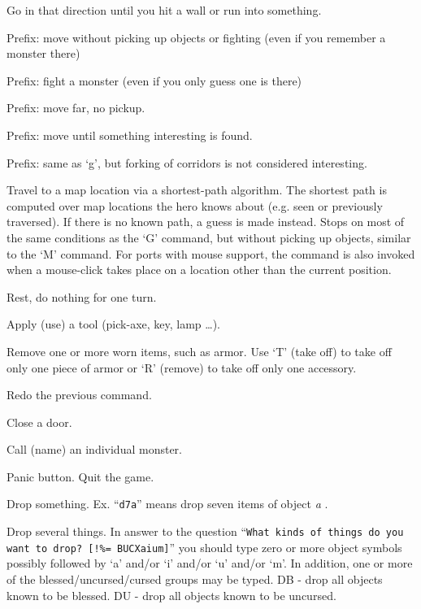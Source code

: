 \item[\tb{[YUHJKLBN]}]
Go in that direction until you hit a wall or run into something.
\item[\tb{m[yuhjklbn]}]
Prefix:  move without picking up objects or fighting (even if you remember
a monster there)
\item[\tb{F[yuhjklbn]}]
Prefix:  fight a monster (even if you only guess one is there)
\item[\tb{M[yuhjklbn]}]
Prefix:  move far, no pickup.
\item[\tb{"g[yuhjklbn]}]
Prefix:  move until something interesting is found.
\item[\tb{"G[yuhjklbn] or <CONTROL->[yuhjklbn]}]
Prefix:  same as `g', but forking of corridors is not considered interesting.
\item[\tb{\_}]
Travel to a map location via a shortest-path algorithm.  The shortest path
is computed over map locations the hero knows about (e.g. seen or
previously traversed).  If there is no known path, a guess is made instead.
Stops on most of
the same conditions as the `G' command, but without picking up
objects, similar to the `M' command.  For ports with mouse 
support, the command is also invoked when a mouse-click takes place on a 
location other than the current position.
\item[\tb{.}]
Rest, do nothing for one turn.
\item[\tb{a}]
Apply (use) a tool (pick-axe, key, lamp \ldots).
\item[\tb{A}]
Remove one or more worn items, such as armor.
Use `T' (take off) to take off only one piece of armor 
or `R' (remove) to take off only one accessory.
\item[\tb{\^A}]
Redo the previous command.
\item[\tb{c}]
Close a door.
\item[\tb{C}]
Call (name) an individual monster.
\item[\tb{\^C}]
Panic button.  Quit the game.
\item[\tb{d}]
Drop something.  Ex. ``{\tt d7a}'' means drop seven items of object %
{\it  a}%
.
\item[\tb{D}]
Drop several things.  In answer to the question
``{\tt What kinds of things do you want to drop? [!\%= BUCXaium]}''
you should type zero or more object symbols possibly followed by 
`a' and/or `i' and/or `u' and/or `m'.  In addition, one or more of
the blessed/uncursed/cursed groups may be typed.
DB  - drop all objects known to be blessed.
DU  - drop all objects known to be uncursed.
